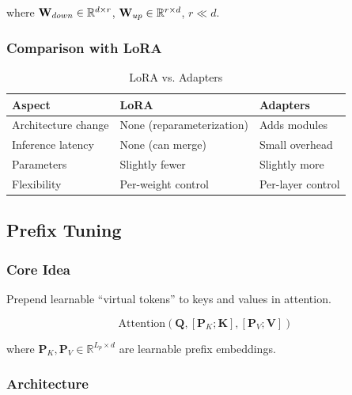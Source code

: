 where $\mathbf{W}_{down} \in \mathbb{R}^{d \times r}$, $\mathbf{W}_{up} \in \mathbb{R}^{r \times d}$, $r \ll d$.

\subsubsection{Comparison with LoRA}

\begin{table}[H]
\centering
\caption{LoRA vs. Adapters}
\begin{tabularx}{\textwidth}{lXX}
\toprule
\textbf{Aspect} & \textbf{LoRA} & \textbf{Adapters} \\
\midrule
Architecture change & None (reparameterization) & Adds modules \\
Inference latency & None (can merge) & Small overhead \\
Parameters & Slightly fewer & Slightly more \\
Flexibility & Per-weight control & Per-layer control \\
\bottomrule
\end{tabularx}
\end{table}

\subsection{Prefix Tuning}

\subsubsection{Core Idea}

Prepend learnable ``virtual tokens'' to keys and values in attention.

\begin{equation}
\text{Attention}(\mathbf{Q}, [\mathbf{P}_K; \mathbf{K}], [\mathbf{P}_V; \mathbf{V}])
\end{equation}

where $\mathbf{P}_K, \mathbf{P}_V \in \mathbb{R}^{L_p \times d}$ are learnable prefix embeddings.
\subsubsection{Architecture}

